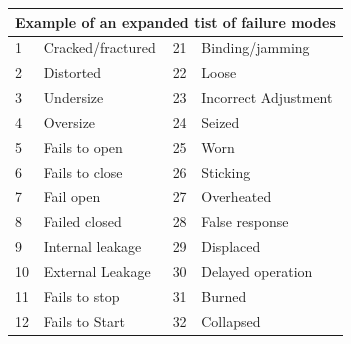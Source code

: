 \documentclass[./dissertation.tex]{subfiles}
\begin{document}
\begin{table}[]
\begin{tabular}{@{}llll@{}}
\toprule
\multicolumn{4}{l}{Example of an expanded tist of failure modes}                                                                                      \\ \midrule
1                          & Cracked/fractured                                 & 21                       & Binding/jamming                           \\
2                          & Distorted                                         & 22                       & Loose                                     \\
3                          & Undersize                                         & 23                       & Incorrect Adjustment                       \\
4                          & Oversize                                          & 24                       & Seized                                    \\
5                          & Fails to open                                     & 25                       & Worn                                      \\
6                          & Fails to close                                    & 26                       & Sticking                                  \\
7                          & Fail open                                         & 27                       & Overheated                                \\
8                          & Failed closed                                     & 28                       & False response                            \\
9                          & Internal leakage                                  & 29                       & Displaced                                 \\
10                         & External Leakage                                  & 30                       & Delayed operation                         \\
11                         & Fails to stop                                     & 31                       & Burned                                    \\
12                         & Fails to Start                                    & 32                       & Collapsed                                 \\

\end{tabular}
\end{table}
\end{document}
